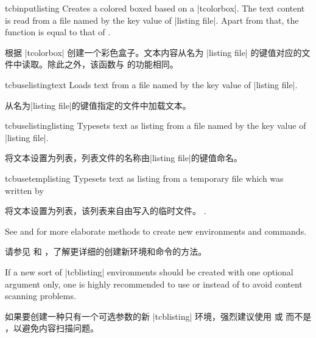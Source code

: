 
\begin{docCommand}{tcbinputlisting}{}
Creates a colored boxed based on a |tcolorbox|. The text content is read
from a file named by the key value of |listing file|. Apart from that,
the function is equal to that of .

根据 |tcolorbox| 创建一个彩色盒子。文本内容从名为 |listing file| 的键值对应的文件中读取。除此之外，该函数与  的功能相同。
\begin{dispExample}
\end{dispExample}
\end{docCommand}

\begin{docCommand}{tcbuselistingtext}{}
Loads text from a file named by the key value of |listing file|.

从名为|listing file|的键值指定的文件中加载文本。
\begin{dispExample}
\tcbuselistingtext
\end{dispExample}
\end{docCommand}


\begin{docCommand}{tcbuselistinglisting}{}
Typesets text as listing from a file named by the key value of |listing file|.

将文本设置为列表，列表文件的名称由|listing file|的键值命名。
\begin{dispExample}
\tcbuselistinglisting
\end{dispExample}
\end{docCommand}

\begin{docCommand}{tcbusetemplisting}{}
Typesets text as listing from a temporary file which was written by

将文本设置为列表，该列表来自由写入的临时文件。
.
\end{docCommand}


\begin{marker}
See  and  for more
elaborate methods to create new environments and commands.

请参见  和 ，了解更详细的创建新环境和命令的方法。
\end{marker}
\begin{marker}
If a new sort of |tcblisting| environments should be created with
one optional argument only, one is highly recommended to use
 or 
instead of  to
avoid content scanning problems.

如果要创建一种只有一个可选参数的新 |tcblisting| 环境，强烈建议使用  或  而不是 ，以避免内容扫描问题。
\end{marker}